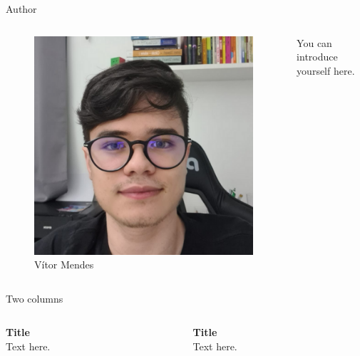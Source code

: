 \documentclass{cubeamer}
\begin{document}
\begin{frame}{Author}
    \begin{columns}
        \centering
        \begin{column}{0.3\textwidth}
            \begin{figure}
                \centering
                \includegraphics[height = 0.5\textheight]{img/mediador.png}
                \caption[]{Vítor Mendes}
            \end{figure}
        \end{column}
        \centering
        \begin{column}{0.5\textwidth}
            \footnotesize
            \justifying
            You can introduce yourself here.

        \end{column}
    \end{columns}
\end{frame}

\begin{frame}{Two columns}
    \begin{columns}
        \centering
        \begin{column}{0.4\textwidth}
            \textbf{Title} \\
            \small
            Text here.

        \end{column}
        \begin{column}{0.5\textwidth}
            \textbf{Title} \\
            \small
            Text here.
        \end{column}
    \end{columns}
\end{frame}
\end{document}
